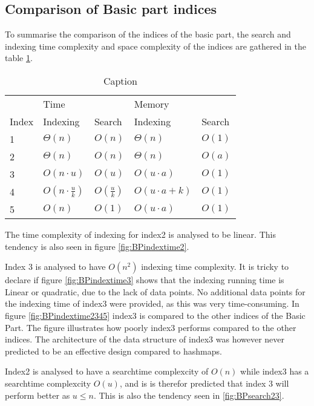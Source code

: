 \subsection{Comparison of Basic part indices}

To summarise the comparison of the indices of the basic part, the search and indexing time complexity and space complexity of the indices are gathered in the table \ref{tab:basicpartTimecomplexity}. 

\begin{table}[th!]
\centering
\begin{tabular}{l|ll|ll}
            & Time &     & Memory & \\
    Index & Indexing & Search & Indexing & Search\\
\hline
1 &  $\Theta(n)$                &  $O(n)$  &  $\Theta(n)$   & $O(1)$ \\
2 &  $\Theta(n)$                &  $O(n)$  &  $\Theta(n)$   & $O(a)$         \\
3  &  $O(n\cdot u)$             &  $O(u)$  &  $O(u\cdot a )$ & $O(1)$         \\
4  &  $O(n\cdot \frac{u}{k})$   &  $O(\frac{u}{k})$  &  $O(u\cdot a + k)$ & $O(1)$ \\
5  &  $O(n)$   &  $O(1)$  &  $O(u\cdot a)$ & $O(1)$         
\end{tabular}
\caption{Caption}
\label{tab:basicpartTimecomplexity}
\end{table}

The time complexity of indexing for index2 is analysed to be linear. This tendency is also seen in figure \ref{fig:BPindextime2}.

Index 3 is analysed to have $O(n^2)$ indexing time complexity. It is tricky to declare if figure \ref{fig:BPindextime3} shows that the indexing running time is Linear or quadratic, due to the lack of data points. No additional data points for the indexing time of index3 were provided, as this was very time-consuming. In figure \ref{fig:BPindextime2345} index3 is compared to the other indices of the Basic Part. The figure illustrates how poorly index3 performs compared to the other indices. The architecture of the data structure of index3 was however never predicted to be an effective design compared to hashmaps. 

Index2 is analysed to have a searchtime complexcity of $O(n)$ while index3 has a searchtime complexcity $O(u)$, and is is therefor predicted that index 3 will perform better as $u\leq n$. This is also the tendency seen in \ref{fig:BPsearch23}.


